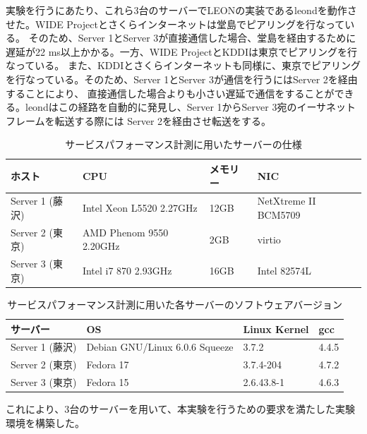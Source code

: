 実験を行うにあたり、これら3台のサーバーでLEONの実装であるleondを動作させた。WIDE Projectとさくらインターネットは堂島でピアリングを行なっている。
そのため、Server 1とServer 3が直接通信した場合、堂島を経由するために遅延が22 ms以上かかる。一方、WIDE ProjectとKDDIは東京でピアリングを行なっている。
また、KDDIとさくらインターネットも同様に、東京でピアリングを行なっている。そのため、Server 1とServer 3が通信を行うにはServer 2を経由することにより、
直接通信した場合よりも小さい遅延で通信をすることができる。leondはこの経路を自動的に発見し、Server 1からServer 3宛のイーサネットフレームを転送する際には
Server 2を経由させ転送をする。

\begin{table}[h]
\begin{center}
	\caption{サービスパフォーマンス計測に用いたサーバーの仕様}
	\begin{tabular}{|l|l|l|l|}
		\hline
		ホスト & CPU & メモリー & NIC \\
		\hline
		\hline
		Server 1 (藤沢) & Intel Xeon L5520 2.27GHz & 12GB & NetXtreme II BCM5709 \\
		\hline
		Server 2 (東京) & AMD Phenom 9550 2.20GHz& 2GB & virtio \\
		\hline
		Server 3 (東京) & Intel i7 870 2.93GHz & 16GB & Intel 82574L \\
		\hline
	\end{tabular}
	\label{table:spserv}
\end{center}
\end{table}

\begin{table}[h]
\begin{center}
	\caption{サービスパフォーマンス計測に用いた各サーバーのソフトウェアバージョン}
	\begin{tabular}{|l|l|l|l|}
		\hline
		サーバー & OS & Linux Kernel & gcc \\
		\hline
		\hline
		Server 1 (藤沢) & Debian GNU/Linux 6.0.6 Squeeze & 3.7.2 & 4.4.5 \\
		\hline
		Server 2 (東京) & Fedora 17			 & 3.7.4-204 & 4.7.2 \\
		\hline
		Server 3 (東京)	& Fedora 15			 & 2.6.43.8-1 & 4.6.3 \\
		\hline
	\end{tabular}
	\label{table:spversion}
\end{center}
\end{table}

これにより、3台のサーバーを用いて、本実験を行うための要求を満たした実験環境を構築した。

